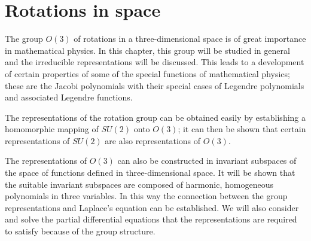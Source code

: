 \chapter{Rotations in space}

The group $O(3)$ of rotations in a three-dimensional space is of great importance in mathematical physics. In this chapter, this group will be studied in general and the irreducible representations will be discussed. This leads to a development of certain properties of some of the special functions of mathematical physics; these are the Jacobi polynomials with their special cases of Legendre polynomials and associated Legendre functions.

The representations of the rotation group can be obtained easily by establishing a homomorphic mapping of $SU(2)$ onto $O(3)$; it can then be shown that certain representations of $SU(2)$ are also representations of $O(3)$.

The representations of $O(3)$ can also be constructed in invariant subspaces of the space of functions defined in three-dimensional space. It will be shown that the suitable invariant subspaces are composed of harmonic, homogeneous polynomials in three variables. In this way the connection between the group representations and Laplace's equation can be established. We will also consider and solve the partial differential equations that the representations are required to satisfy because of the group structure.








\endinput